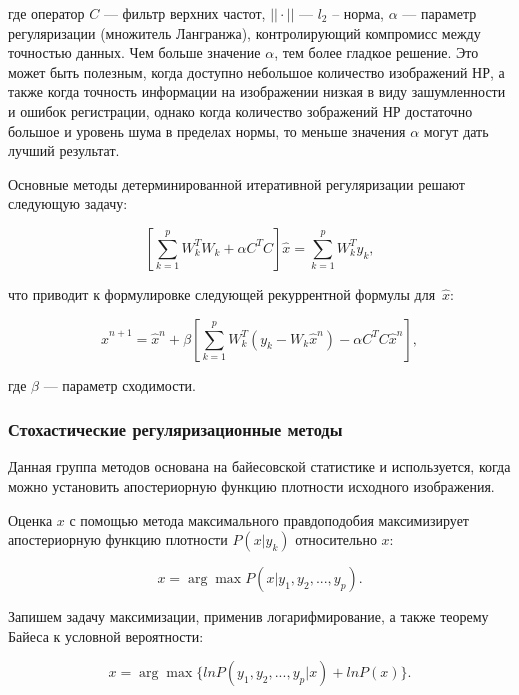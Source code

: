 где оператор $C$ --- фильтр верхних частот, $||\cdot||$ --- $l_2$ -- норма, $\alpha$ --- параметр регуляризации (множитель Лангранжа), контролирующий компромисс между точностью данных. Чем больше значение $\alpha$, тем более гладкое решение. Это может быть полезным, когда доступно небольшое количество изображений НР, а также когда точность информации на изображении низкая в виду зашумленности и ошибок регистрации, однако когда количество зображений НР достаточно большое и уровень шума в пределах нормы, то меньше значения $\alpha$ могут дать лучший результат.

Основные методы детерминированной итеративной регуляризации решают следующую задачу:

\begin{equation}
    \left[\sum_{k=1}^{p} W_k^TW_k + \alpha C^TC\right]\hat{x} = \sum_{k=1}^{p} W_k^Ty_k, 
\end{equation}

что приводит к формулировке следующей рекуррентной формулы для~$\hat{x}$:

\begin{equation}
    \hat{x}^{n+1} = \hat{x}^n + \beta \left[\sum_{k=1}^{p} W_k^T (y_k - W_k \hat{x}^n) - \alpha C^TC \hat{x}^n \right],
\end{equation}

где $\beta$ --- параметр сходимости.

 \subsubsection{Стохастические регуляризационные методы}

Данная группа методов основана на байесовской статистике и используется, когда можно установить апостериорную функцию плотности исходного изображения.

Оценка $x$ с помощью метода максимального правдоподобия максимизирует апостериорную функцию плотности $P(x|y_k)$ относительно $x$:

\begin{equation}
    x = \arg \max P(x | y_1, y_2, ..., y_p).
\end{equation}

Запишем задачу максимизации, применив логарифмирование, а также теорему Байеса к условной вероятности:

\begin{equation}
    x = \arg \max \{ln P(y_1, y_2, ..., y_p | x) + ln P(x)\}.
\end{equation}

